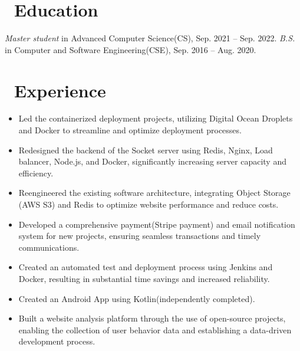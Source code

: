 \documentclass{resume}
\begin{document}



\section{\faGraduationCap\ Education}
\textit{Master student} in Advanced Computer Science(CS), Sep. 2021 -- Sep. 2022.
\textit{B.S.} in Computer and Software Engineering(CSE), Sep. 2016 -- Aug. 2020.

\section{\faUsers\ Experience}
\begin{itemize}
  \item Led the containerized deployment projects, utilizing Digital Ocean Droplets and Docker to streamline and optimize deployment processes.
  \item Redesigned the backend of the Socket server using Redis, Nginx, Load balancer, Node.js, and Docker, significantly increasing server capacity and efficiency.
  \item Reengineered the existing software architecture, integrating Object Storage (AWS S3) and Redis to optimize website performance and reduce costs.
  \item Developed a comprehensive payment(Stripe payment) and email notification system for new projects, ensuring seamless transactions and timely communications.
  \item Created an automated test and deployment process using Jenkins and Docker, resulting in substantial time savings and increased reliability.
  \item Created an Android App using Kotlin(independently completed).
  \item Built a website analysis platform through the use of open-source projects, enabling the collection of user behavior data and establishing a data-driven development process.
\end{itemize}
\end{document}
